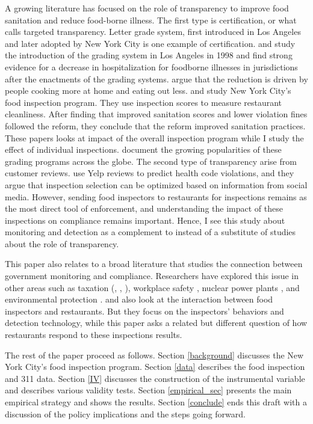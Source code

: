 \documentclass[11pt]{article}
\begin{document}
A growing literature has focused on the role of transparency to improve food sanitation and reduce food-borne illness. The first type is certification, or what \cite{Ho_2012} calls targeted transparency. Letter grade system, first introduced in Los Angeles and later adopted by New York City is one example of certification. \cite{jie_leslie_05} and \cite{Simon_05} study the introduction of the grading system in Los Angeles in 1998 and find strong evidence for a decrease in hospitalization for foodborne illnesses in jurisdictions after the enactments of the grading systems. \cite{jie_leslie_05} argue that the reduction is driven by people cooking more at home and eating out less. \cite{Wong_at_el_2015} and \cite{Meltzer_2015} study New York City's food inspection program. They use inspection scores to measure restaurant cleanliness. After finding that improved sanitation scores and lower violation fines followed the reform, they conclude that the reform improved sanitation practices. These papers looks at impact of the overall inspection program while I study the effect of individual inspections. \cite{Filion_Powell_09} document the growing popularities of these grading programs across the globe. The second type of transparency arise from customer reviews. \cite{Luca_13} use Yelp reviews to predict health code violations, and they argue that inspection selection can be optimized based on information from social media. However, sending food inspectors to restaurants for inspections remains as the most direct tool of enforcement, and understanding the impact of these inspections on compliance remains important. Hence, I see this study about monitoring and detection as a complement to instead of a substitute of studies about the role of transparency. 

This paper also relates to a broad literature that studies the connection between government monitoring and compliance. Researchers have explored this issue in other areas such as taxation (\cite{Feinstein_91}, \cite{Kleven_etal_10}, \cite{Gemmell_Ratto_12}), workplace safety \citep{levine_etal_12}, nuclear power plants \citep{Feinstein_89}, and environmental protection \citep{Duflo_Greenstone_14}. \cite{Jin_Lee_12} and \cite{Jin_Lee_14} also look at the interaction between food inspectors and restaurants. But they focus on the inspectors' behaviors and detection technology, while this paper asks a related but different question of how restaurants respond to these inspections results. 

The rest of the paper proceed as follows. Section \ref{background} discusses the New York City's food inspection program. Section \ref{data} describes the food inspection and 311 data. Section \ref{IV} discusses the construction of the instrumental variable and describes various validity tests. Section \ref{empirical_sec} presents the main empirical strategy and shows the results. Section \ref{conclude} ends this draft with a discussion of the policy implications and the steps going forward. 
\end{document}
